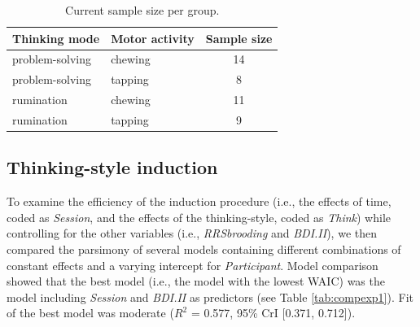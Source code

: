 \documentclass[a4paper,12pt,twoside,onecolumn,openright,final,oldfontcommands]{memoir}
\begin{document}
\begin{table}[H]
\begin{center}
\begin{threeparttable}
\caption{\label{tab:sampleszize}Current sample size per group.}
\begin{tabular}{llc}
\toprule
Thinking mode & Motor activity & Sample size\\
\midrule
problem-solving & chewing & 14\\
problem-solving & tapping & 8\\
rumination & chewing & 11\\
rumination & tapping & 9\\
\bottomrule
\end{tabular}
\end{threeparttable}
\end{center}
\end{table}

\hypertarget{thinking-style-induction-1}{%
\subsection{Thinking-style induction}\label{thinking-style-induction-1}}

To examine the efficiency of the induction procedure (i.e., the effects of time, coded as \emph{Session}, and the effects of the thinking-style, coded as \emph{Think}) while controlling for the other variables (i.e., \emph{RRSbrooding} and \emph{BDI.II}), we then compared the parsimony of several models containing different combinations of constant effects and a varying intercept for \emph{Participant}. Model comparison showed that the best model (i.e., the model with the lowest WAIC) was the model including \emph{Session} and \emph{BDI.II} as predictors (see Table \ref{tab:compexp1}). Fit of the best model was moderate (\(R^2\) = 0.577, 95\% CrI {[}0.371, 0.712{]}).
\end{document}
